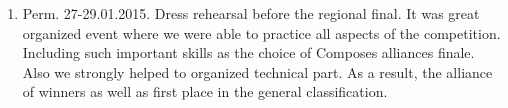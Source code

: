 \begin{enumerate}
\begin{figure}[H]
	     	\end{figure}	
			\item Perm. 27-29.01.2015. Dress rehearsal before the regional final. It was great organized event where we were able to practice all aspects of the competition. Including such important skills as the choice of Composes alliances finale. Also we strongly helped to organized technical part. As a result, the alliance of winners as well as first place in the general classification.
			\begin{figure}[H]
				\\
	     	\end{figure}
		\end{enumerate}  
